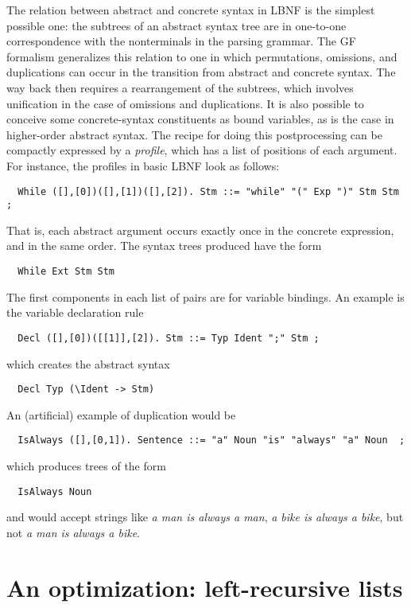 \documentclass[10pt]{article}
\begin{document}
The relation between abstract and concrete syntax in LBNF is the
simplest possible one: the subtrees of an abstract syntax tree
are in one-to-one correspondence with the nonterminals in
the parsing grammar. The GF formalism generalizes this relation to one in which
permutations, omissions, and duplications can occur in the
transition from abstract and concrete syntax. The way back
then requires a rearrangement of the subtrees, which involves
unification in the case of omissions and duplications.
It is also possible to conceive some concrete-syntax constituents
as bound variables, as is the case in higher-order abstract syntax.
The recipe for doing this postprocessing can be compactly
expressed by a \textit{profile}, which has a list of positions
of each argument. For instance, the profiles in basic LBNF look
as follows:
\begin{verbatim}
  While ([],[0])([],[1])([],[2]). Stm ::= "while" "(" Exp ")" Stm Stm ;
\end{verbatim}
That is, each abstract argument occurs exactly once in the concrete
expression, and in the same order. The syntax trees produced have the form
\begin{verbatim}
  While Ext Stm Stm
\end{verbatim}
The first components in each list of pairs 
are for variable bindings. An example is the
variable declaration rule
\begin{verbatim}
  Decl ([],[0])([[1]],[2]). Stm ::= Typ Ident ";" Stm ;
\end{verbatim}
which creates the abstract syntax
\begin{verbatim}
  Decl Typ (\Ident -> Stm)
\end{verbatim}
An (artificial) example of duplication would be
\begin{verbatim}
  IsAlways ([],[0,1]). Sentence ::= "a" Noun "is" "always" "a" Noun  ;
\end{verbatim}
which produces trees of the form
\begin{verbatim}
  IsAlways Noun
\end{verbatim}
and would accept strings like \textit{a man is always a man},
\textit{a bike is always a bike}, but not \textit{a man is always a bike}.


\section{An optimization: left-recursive lists}

\label{leftrec}
\end{document}
